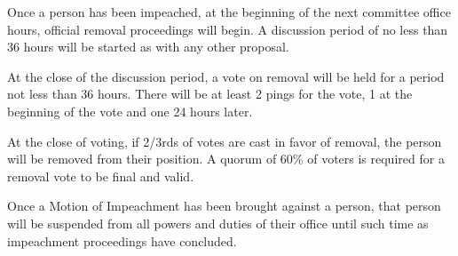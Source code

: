 \begin{deepEnumerate}
\begin{deepEnumerate}
\begin{deepEnumerate}
			\item Once a person has been impeached, at the beginning of the next committee office hours, official removal proceedings will begin. 
			A discussion period of no less than 36 hours will be started as with any other proposal.
			\item At the close of the discussion period, a vote on removal will be held for a period not less than 36 hours. 
			There will be at least 2 pings for the vote, 1 at the beginning of the vote and one 24 hours later.
			\item At the close of voting, if 2/3rds of votes are cast in favor of removal, the person will be removed from their position. 
			A quorum of 60\% of voters is required for a removal vote to be final and valid.
		\end{deepEnumerate}
		\item Once a Motion of Impeachment has been brought against a person, that person will be suspended from all powers and duties of their office 
		until such time as impeachment proceedings have concluded.
	\end{deepEnumerate}
\end{deepEnumerate}

